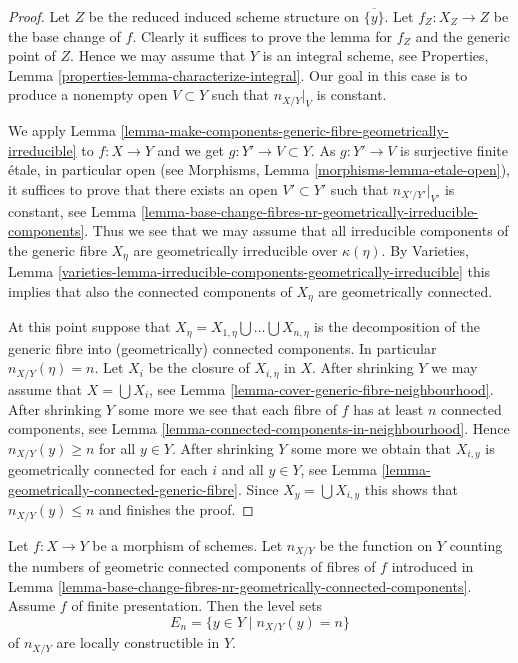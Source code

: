 \begin{proof}
Let $Z$ be the reduced induced scheme structure on $\overline{\{y\}}$.
Let $f_Z : X_Z \to Z$ be the base change of $f$. Clearly it suffices to prove
the lemma for $f_Z$ and the generic point of $Z$. Hence we may assume that
$Y$ is an integral scheme, see
Properties, Lemma \ref{properties-lemma-characterize-integral}.
Our goal in this case is to produce a nonempty open $V \subset Y$ such that
$n_{X/Y}|_V$ is constant.

\medskip\noindent
We apply
Lemma \ref{lemma-make-components-generic-fibre-geometrically-irreducible}
to $f : X \to Y$ and we get $g : Y' \to V \subset Y$. As $g : Y' \to V$ is
surjective finite \'etale, in particular open (see
Morphisms, Lemma \ref{morphisms-lemma-etale-open}),
it suffices to prove that there exists an open $V' \subset Y'$
such that $n_{X'/Y'}|_{V'}$ is constant, see
Lemma \ref{lemma-base-change-fibres-nr-geometrically-irreducible-components}.
Thus we see that we may assume that all irreducible components of
the generic fibre $X_\eta$ are geometrically irreducible over $\kappa(\eta)$.
By
Varieties, Lemma
\ref{varieties-lemma-irreducible-components-geometrically-irreducible}
this implies that also the connected components of $X_\eta$ are
geometrically connected.

\medskip\noindent
At this point suppose that
$X_\eta = X_{1, \eta} \bigcup \ldots \bigcup X_{n, \eta}$
is the decomposition of the generic fibre into
(geometrically) connected components.
In particular $n_{X/Y}(\eta) = n$.
Let $X_i$ be the closure of
$X_{i, \eta}$ in $X$. After shrinking $Y$ we may assume that
$X = \bigcup X_i$, see
Lemma \ref{lemma-cover-generic-fibre-neighbourhood}.
After shrinking $Y$ some more we see that each fibre of
$f$ has at least $n$ connected components, see
Lemma \ref{lemma-connected-components-in-neighbourhood}.
Hence $n_{X/Y}(y) \geq n$ for all $y \in Y$.
After shrinking $Y$ some more we obtain that $X_{i, y}$
is geometrically connected for each $i$ and all $y \in Y$, see
Lemma \ref{lemma-geometrically-connected-generic-fibre}.
Since $X_y = \bigcup X_{i, y}$
this shows that $n_{X/Y}(y) \leq n$ and finishes the proof.
\end{proof}

\begin{lemma}
\label{lemma-nr-geom-connected-components-constructible}
Let $f : X \to Y$ be a morphism of schemes. Let
$n_{X/Y}$ be the function on $Y$ counting the numbers of geometric
connected components of fibres of $f$ introduced in
Lemma \ref{lemma-base-change-fibres-nr-geometrically-connected-components}.
Assume $f$ of finite presentation. Then the level sets
$$
E_n = \{y \in Y \mid n_{X/Y}(y) = n\}
$$
of $n_{X/Y}$ are locally constructible in $Y$.
\end{lemma}

